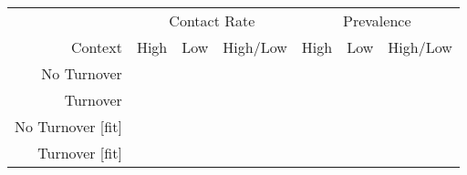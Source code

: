 \begin{tabular}{rcccccc}
	\toprule
  & \multicolumn{3}{c}{Contact Rate} & \multicolumn{3}{c}{Prevalence} \\
  \cmidrule(lr){2-4}\cmidrule(lr){5-7}
  Context & High & Low & High/Low & High & Low & High/Low \\\midrule
  No Turnover &
  
  & 
  & 
  & 
  & 
  & \textbf{}\\
  Turnover &
    
  & 
  & 
  & 
  & 
  & \textbf{}\\
  No Turnover [fit] &
    
  & 
  & \textbf{}
  & 
  & 
  & \\
  Turnover [fit] &
  
  & 
  & \textbf{}
  & 
  & 
  & \\
  \bottomrule
\end{tabular}
